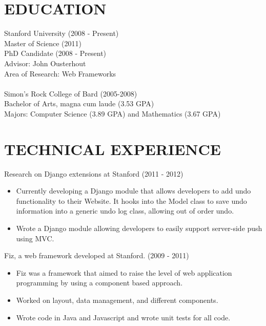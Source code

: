 \documentclass{res}
\begin{document}
 


\address{\bf 144 Ayrshire Farm Ln Apt \#103\\Stanford, CA 94305\\estrat@cs.stanford.edu\\(203) 645-9982\\\url{http://github.com/ericstratmann}}
\address{}
                                  
\begin{resume}
  
\section{EDUCATION}          
Stanford University (2008 - Present) \\
Master of Science (2011) \\
PhD Candidate (2008 - Present)\\
Advisor: John Ousterhout \\
Area of Research: Web Frameworks\\
\\
Simon's Rock College of Bard (2005-2008)\\
Bachelor of Arts, magna cum laude (3.53 GPA)\\
Majors: Computer Science (3.89 GPA) and Mathematics (3.67 GPA)

\section{TECHNICAL EXPERIENCE}

Research on Django extensions at Stanford (2011 - 2012)
\begin{itemize}
    \item { Currently developing a Django module that allows developers to add undo functionality to their Website. It hooks into the Model class to save undo information into a generic undo log class, allowing out of order undo. }
    \item { Wrote a Django module allowing developers to easily support server-side push using MVC.}
\end{itemize}

Fiz, a web framework developed at Stanford. (2009 - 2011)
\begin{itemize}
    \item Fiz was a framework that aimed to raise  the level of web application programming by using a component based approach.
    \item Worked on layout, data management, and different components.
    \item Wrote code in Java and Javascript and wrote unit tests for all code.
\end{itemize}


\end{resume}
\end{document}
